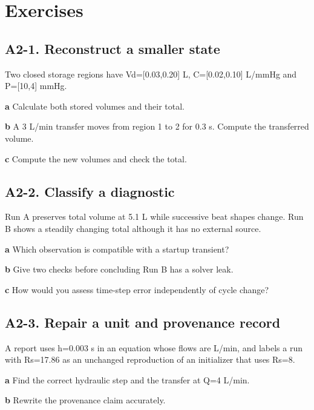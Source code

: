 \documentclass[11pt,letterpaper]{article}
\theoremstyle{definition}\newtheorem{definition}{Definition}\newtheorem{example}{Example}
\numberwithin{equation}{section}
\begin{document}
\section*{Exercises}
\par\noindent\begin{minipage}{\linewidth}
\subsection*{A2-1. Reconstruct a smaller state}
Two closed storage regions have Vd=\allowbreak{}[0.03,0.20] L, C=\allowbreak{}[0.02,0.10] L/mmHg and P=\allowbreak{}[10,4] mmHg.

\textbf{a} Calculate both stored volumes and their total.

\end{minipage}\par\medskip
\textbf{b} A 3 L/min transfer moves from region 1 to 2 for 0.3 s. Compute the transferred volume.

\textbf{c} Compute the new volumes and check the total.

\par\noindent\begin{minipage}{\linewidth}
\subsection*{A2-2. Classify a diagnostic}
Run A preserves total volume at 5.1 L while successive beat shapes change. Run B shows a steadily changing total although it has no external source.

\textbf{a} Which observation is compatible with a startup transient?

\end{minipage}\par\medskip
\textbf{b} Give two checks before concluding Run B has a solver leak.

\textbf{c} How would you assess time-step error independently of cycle change?

\par\noindent\begin{minipage}{\linewidth}
\subsection*{A2-3. Repair a unit and provenance record}
A report uses h=\allowbreak{}0.003 s in an equation whose flows are L/min, and labels a run with Rs=\allowbreak{}17.86 as an unchanged reproduction of an initializer that uses Rs=\allowbreak{}8.

\textbf{a} Find the correct hydraulic step and the transfer at Q=\allowbreak{}4 L/min.

\end{minipage}\par\medskip
\textbf{b} Rewrite the provenance claim accurately.
\end{document}
